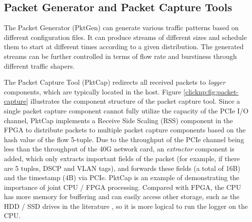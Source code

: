 
\subsection{Packet Generator and Packet Capture Tools}
The Packet Generator (PktGen) can generate various traffic patterns based on different configuration files. It can produce streams of different sizes and schedule them to start at different times according to a given distribution. The generated streams can be further controlled in terms of flow rate and burstiness through different traffic shapers.

The Packet Capture Tool (PktCap) redirects all received packets to \textit{logger} components, which are typically located in the host. Figure \ref{clicknp:fig:packet-capture} illustrates the component structure of the packet capture tool. Since a single packet capture component cannot fully utilize the capacity of the PCIe I/O channel, PktCap implements a Receive Side Scaling (RSS) component in the FPGA to distribute packets to multiple packet capture components based on the hash value of the flow 5-tuple. Due to the throughput of the PCIe channel being less than the throughput of the 40G network card, an \textit{extractor} component is added, which only extracts important fields of the packet (for example, if there are 5 tuples, DSCP and VLAN tags), and forwards these fields (a total of 16B) and the timestamp (4B) via PCIe. PktCap is an example of demonstrating the importance of joint CPU / FPGA processing. Compared with FPGA, the CPU has more memory for buffering and can easily access other storage, such as the HDD / SSD drives in the literature \cite{lee2015flosis}, so it is more logical to run the logger on the CPU.

